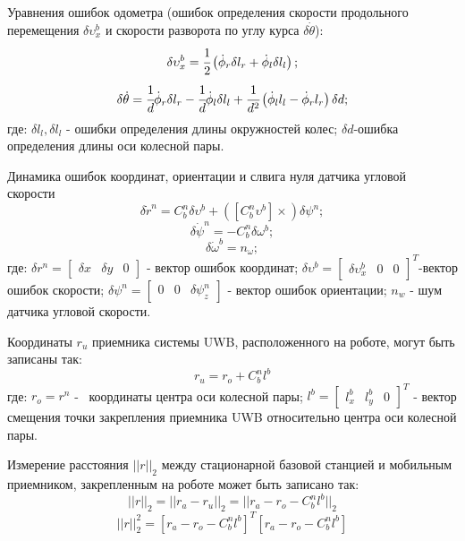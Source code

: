 \documentclass[14pt]{article}
\begin{document}
Уравнения ошибок одометра (ошибок определения скорости продольного перемещения $\delta\upsilon_x^b$ и скорости разворота по углу курса $\delta\dot\theta$):
\begin{equation}
\delta\upsilon_x^b = \cfrac{1}{2}\left(\dot{\phi}_r \delta l_r+\dot{\phi}_l \delta l_l\right);
\end{equation}
\begin{equation}
\delta\dot\theta = \cfrac{1}{d}\dot{\phi}_r \delta l_r-\cfrac{1}{d}\dot{\phi}_l \delta l_l+\cfrac{1}{d^2}\left(\dot{\phi}_l  l_l-\dot{\phi}_r l_r\right)\delta d;
\end{equation}
где: $\delta l_l, \delta l_l$ - ошибки определения длины окружностей колес; $\delta d$-ошибка определения длины оси колесной пары.

Динамика ошибок координат, ориентации и слвига нуля датчика угловой скорости 
\begin{equation}
\delta\dot{r}^n=C_b^n\delta\upsilon^b+\left(\left[C_b^n\upsilon^b\right]\times\right)\delta\psi^n;
\end{equation}
\begin{equation}
\delta\dot{\psi}^n=-C_b^n\delta\omega^b;
\end{equation}
\begin{equation}
\delta\dot{\omega}^b=n_\omega;
\end{equation}
где: $\delta r^n=\begin{bmatrix}\delta x&\delta y&0\end{bmatrix}$ - вектор ошибок координат; $\delta\upsilon^b=\begin{bmatrix}\delta\upsilon_x^b&0&0\end{bmatrix}^T$-вектор ошибок скорости; $\delta\psi^n=\begin{bmatrix}0&0&\delta\psi^n_z\end{bmatrix}$  - вектор ошибок ориентации; $n_w$ - шум датчика угловой скорости.

Координаты $r_u$ приемника системы UWB, расположенного на роботе, могут быть записаны так:
\begin{equation}
r_u = r_o+C_b^nl^b
\end{equation}
где: $r_o=r^n$ -  координаты центра оси колесной пары; $l^b = \begin{bmatrix}l^b_x&l^b_y&0\end{bmatrix}^T$ - вектор смещения точки закрепления приемника UWB относительно центра оси колесной пары.

Измерение расстояния $||r||_2$ между стационарной базовой станцией и мобильным приемником, закрепленным на роботе может быть записано так:
\begin{equation}
   ||r||_2 = ||r_a-r_u||_2=||r_a-r_o-C_b^n l^b||_2
\end{equation}
 \begin{equation}
   ||r||_2^2 = \left[r_a-r_o-C_b^n l^b\right]^T\left[r_a-r_o-C_b^n l^b\right]
\end{equation}
\end{document}
